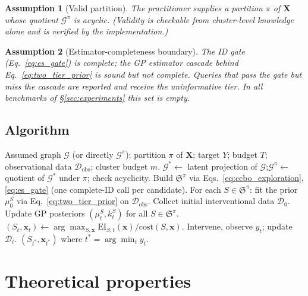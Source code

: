 \documentclass{article}
\newtheorem{assumption}{Assumption}
\newcommand{\QCBO}{\textsc{QCBO}}
\newcommand{\Gq}{\mathcal{G}^{\pi}}
\newcommand{\Gg}{\mathcal{G}}
\newcommand{\ESpi}{\mathfrak{S}^{\pi}}
\begin{document}
\begin{assumption}[Valid partition]
\label{ass:valid}
The practitioner supplies a partition $\pi$ of $\mathbf{X}$ whose quotient
$\Gq$ is acyclic. (Validity is checkable from cluster-level knowledge
alone and is verified by the implementation.)
\end{assumption}

\begin{assumption}[Estimator-completeness boundary]
\label{ass:id_scheme}
The ID gate (Eq.~\ref{eq:es_gate}) is complete; the GP estimator cascade
behind Eq.~\eqref{eq:two_tier_prior} is sound but not complete. Queries
that pass the gate but miss the cascade are reported and receive the
uninformative tier. In all benchmarks of \S\ref{sec:experiments} this set
is empty.
\end{assumption}

\subsection{Algorithm}

\begin{algorithm}[t]
\caption{\QCBO: Quotient Causal Bayesian Optimization}
\label{alg:ccbo}
\begin{algorithmic}[1]
\REQUIRE Assumed graph $\Gg$ (or directly $\Gq$); partition $\pi$ of
$\mathbf{X}$; target $Y$; budget $T$; observational data
$\mathcal{D}_{\mathrm{obs}}$; cluster budget $m$.
\STATE $\Gg^* \leftarrow$ latent projection of $\Gg$;\quad $\Gq
\leftarrow$ quotient of $\Gg^*$ under $\pi$; check acyclicity.
\STATE Build $\ESpi$ via Eqs.~\eqref{eq:ccbo_exploration},
\eqref{eq:es_gate} (one complete-ID call per candidate).
\STATE For each $S \in \ESpi$: fit the prior $\mu_0^S$ via
Eq.~\eqref{eq:two_tier_prior} on $\mathcal{D}_{\mathrm{obs}}$.
\STATE Collect initial interventional data $\mathcal{D}_0$.
  \STATE Update GP posteriors $(\mu_t^S, k_t^S)$ for all $S \in \ESpi$.
  \STATE $(S_t, \mathbf{x}_t) \leftarrow \arg\max_{S,\mathbf{x}}
  \mathrm{EI}_{S,t}(\mathbf{x}) / \mathrm{cost}(S,\mathbf{x})$.
  \STATE Intervene, observe $y_t$; update $\mathcal{D}_t$.
\ENDFOR
\RETURN $(S_{t^*}, \mathbf{x}_{t^*})$ where $t^* = \arg\min_t y_t$.
\end{algorithmic}
\end{algorithm}


\section{Theoretical properties}
\label{sec:theory}
\end{document}
